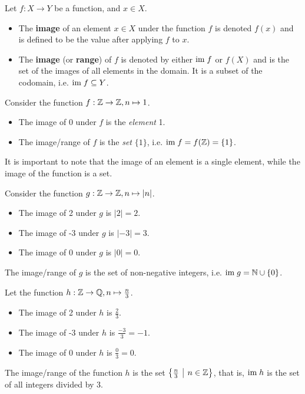 \begin{definition}
    Let $f: X \to Y$ be a function, and $x \in X$.
    \begin{itemize}
        \item The \textbf{image} of an element $x \in X$ under the function $f$ is denoted $f(x)$ and is defined to be the value after applying $f$ to $x$.
        \item The \textbf{image} (or \textbf{range}) of $f$ is denoted by either $\mathrm{im}\; f$ or $f(X)$ and is the set of the images of all elements in the domain. It is a subset of the codomain, i.e. $\mathrm{im}\; f \subseteq Y$.
    \end{itemize}
\end{definition}
\begin{example}
    Consider the function $f: \mathbb{Z} \to \mathbb{Z}, n \mapsto 1$.
    \begin{itemize}
        \item The image of 0 under $f$ is the \textit{element} 1.
        \item The image/range of $f$ is the \textit{set} $\{1\}$, i.e. $\mathrm{im}\; f = f(\mathbb{Z}) = \{1\}$.
    \end{itemize}
    It is important to note that the image of an element is a single element, while the image of the function is a set.
\end{example}
\begin{example}
    Consider the function $g: \mathbb{Z} \to \mathbb{Z}, n \mapsto |n|$.
    \begin{itemize}
        \item The image of 2 under $g$ is $|2| = 2$.
        \item The image of -3 under $g$ is $|-3| = 3$.
        \item The image of 0 under $g$ is $|0| = 0$.
    \end{itemize}
    The image/range of $g$ is the set of non-negative integers, i.e. $\mathrm{im}\; g = \mathbb{N} \cup \{0\}$.
\end{example}
\begin{example}
    Let the function $h: \mathbb{Z} \to \mathbb{Q}, n\mapsto\frac n3$.
    \begin{itemize}
        \item The image of 2 under $h$ is $\frac23$.
        \item The image of -3 under $h$ is $\frac{-3}3 = -1$.
        \item The image of 0 under $h$ is $\frac03 = 0$.
    \end{itemize}
    The image/range of the function $h$ is the set $\left\{\frac n3 \vert n \in \Z\right\}$, that is, $\mathrm{im}\; h$ is the set of all integers divided by 3.
\end{example}

